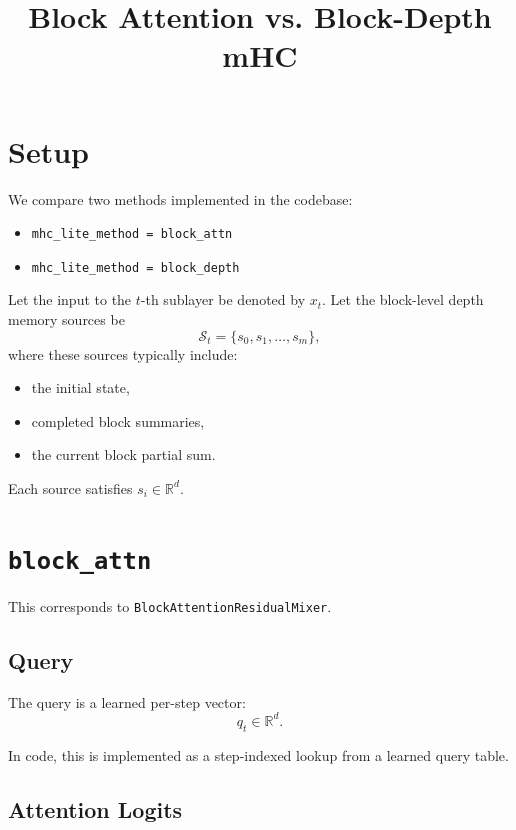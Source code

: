 \documentclass[11pt]{article}
\title{Block Attention vs. Block-Depth mHC}
\author{}
\date{}
\begin{document}
\maketitle

\section{Setup}

We compare two methods implemented in the codebase:
\begin{itemize}
    \item \texttt{mhc\_lite\_method = block\_attn}
    \item \texttt{mhc\_lite\_method = block\_depth}
\end{itemize}

Let the input to the $t$-th sublayer be denoted by $x_t$.
Let the block-level depth memory sources be
\begin{equation}
    \mathcal{S}_t = \{s_0, s_1, \dots, s_m\},
\end{equation}
where these sources typically include:
\begin{itemize}
    \item the initial state,
    \item completed block summaries,
    \item the current block partial sum.
\end{itemize}

Each source satisfies $s_i \in \mathbb{R}^d$.

\section{\texttt{block\_attn}}

This corresponds to \texttt{BlockAttentionResidualMixer}.

\subsection{Query}

The query is a learned per-step vector:
\begin{equation}
    q_t \in \mathbb{R}^d.
\end{equation}

In code, this is implemented as a step-indexed lookup from a learned query table.

\subsection{Attention Logits}
\end{document}
